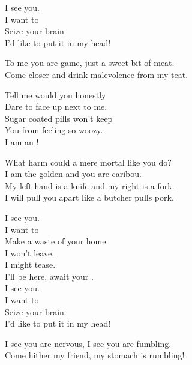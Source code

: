 I see you. \\
I want to \\
Seize your brain \\
I'd like to put it in my head! \\


To me you are game, just a sweet bit of meat. \\
Come closer and drink malevolence from my teat. \\


Tell me would you honestly \\
Dare to face up next to me. \\
Sugar coated pills won't keep \\
You from feeling so woozy. \\

I am an  ! \\


What harm could a mere mortal like you do? \\
I am the golden  and you are caribou. \\

My left hand is a knife and my right is a fork. \\
I will pull you apart like a butcher pulls pork. \\


I see you. \\
I want to \\
Make a waste of your home. \\

I won't leave. \\
I might tease. \\
I'll be here, await your . \\

I see you. \\
I want to \\
Seize your brain. \\
I'd like to put it in my head! \\


I see you are nervous, I see you are fumbling. \\
Come hither my friend, my stomach is rumbling! \\

